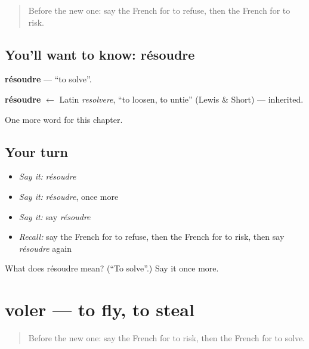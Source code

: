 \label{lesson:FR-C238-resoudre}



\begin{quote}
Before the new one: say the French for to refuse, then the French for to risk.
\end{quote}

\subsection*{You'll want to know: résoudre}
\textbf{résoudre} — \textquotedblleft{}to solve\textquotedblright{}.

\begin{cousinweb}
\textbf{résoudre} $\leftarrow$ Latin \emph{resolvere}, \textquotedblleft{}to loosen, to untie\textquotedblright{} (Lewis \& Short) — inherited.
\end{cousinweb}

\begin{grammarlens}[title={What you've built}]
One more word for this chapter.
\end{grammarlens}

\subsection*{Your turn}
\begin{itemize}
\raggedright
  \item \emph{Say it:} \emph{résoudre}
  \item \emph{Say it:} \emph{résoudre}, once more
  \item \emph{Say it:} say \emph{résoudre}
  \item \emph{Recall:} say the French for to refuse, then the French for to risk, then say \emph{résoudre} again
\end{itemize}

\begin{tcolorbox}[breakable,colback=teal!4,colframe=teal!35!black,title={Before you move on}]
What does résoudre mean? (\textquotedblleft{}To solve\textquotedblright{}.) Say it once more.
\end{tcolorbox}
\section[voler]{voler — to fly, to steal}

\label{lesson:FR-C238-voler}



\begin{quote}
Before the new one: say the French for to risk, then the French for to solve.
\end{quote}

